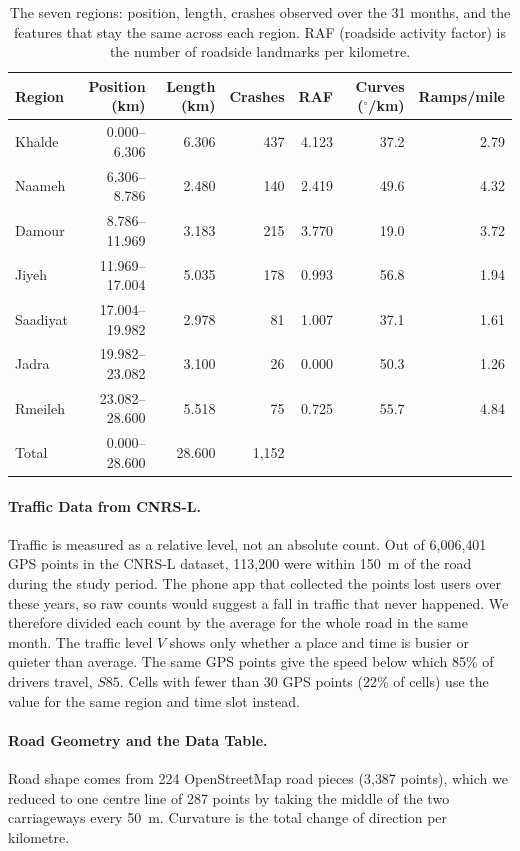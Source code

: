 \documentclass[11pt]{article}
\begin{document}
\begin{table}[htbp]
\centering
\caption{The seven regions: position, length, crashes observed over the 31
months, and the features that stay the same across each region. RAF (roadside
activity factor) is the number of roadside landmarks per kilometre.}
\label{tab:regions}
\small
\begin{tabular}{@{}lrrrrrr@{}}
\toprule
\textbf{Region} & \textbf{Position (km)} & \textbf{Length (km)} & \textbf{Crashes} & \textbf{RAF} & \textbf{Curves ($^{\circ}$/km)} & \textbf{Ramps/mile} \\
\midrule
Khalde   & 0.000--6.306   & 6.306 & 437 & 4.123 & 37.2 & 2.79 \\
Naameh   & 6.306--8.786   & 2.480 & 140 & 2.419 & 49.6 & 4.32 \\
Damour   & 8.786--11.969  & 3.183 & 215 & 3.770 & 19.0 & 3.72 \\
Jiyeh    & 11.969--17.004 & 5.035 & 178 & 0.993 & 56.8 & 1.94 \\
Saadiyat & 17.004--19.982 & 2.978 &  81 & 1.007 & 37.1 & 1.61 \\
Jadra    & 19.982--23.082 & 3.100 &  26 & 0.000 & 50.3 & 1.26 \\
Rmeileh  & 23.082--28.600 & 5.518 &  75 & 0.725 & 55.7 & 4.84 \\
\midrule
Total    & 0.000--28.600  & 28.600 & 1{,}152 & & & \\
\bottomrule
\end{tabular}
\end{table}

\paragraph{Traffic Data from CNRS-L.}
Traffic is measured as a relative level, not an absolute count. Out of
6{,}006{,}401 GPS points in the CNRS-L dataset, 113{,}200 were within 150~m of
the road during the study period. The phone app that collected the points lost
users over these years, so raw counts would suggest a fall in traffic that
never happened. We therefore divided each count by the average for the whole
road in the same month. The traffic level $V$ shows only whether a place and
time is busier or quieter than average. The same GPS points give the speed
below which 85\% of drivers travel, $S85$. Cells with fewer than 30 GPS points
(22\% of cells) use the value for the same region and time slot instead.

\paragraph{Road Geometry and the Data Table.}
Road shape comes from 224 OpenStreetMap road pieces (3{,}387 points), which we
reduced to one centre line of 287 points by taking the middle of the two
carriageways every 50~m. Curvature is the total change of direction per
kilometre.
\end{document}
